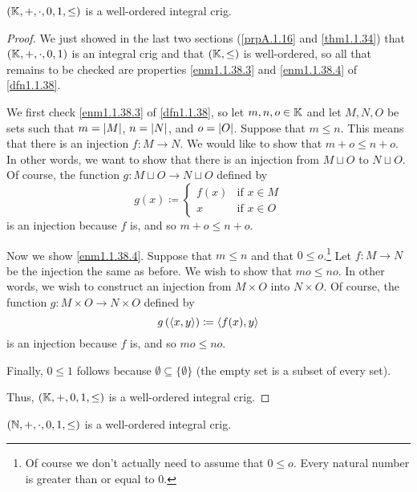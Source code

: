 \begin{prp}
$(\mathbb{K} ,+,\cdot ,0,1,\leq )$ is a well-ordered integral crig.
\begin{proof}
We just showed in the last two sections (\cref{prpA.1.16} and \cref{thm1.1.34}) that $(\mathbb{K} ,+,\cdot ,0,1)$ is an integral crig and that $(\mathbb{K} ,\leq )$ is well-ordered, so all that remains to be checked are properties \ref{enm1.1.38.3} and \ref{enm1.1.38.4} of \cref{dfn1.1.38}.

We first check \ref{enm1.1.38.3} of \cref{dfn1.1.38}, so let $m,n,o\in \mathbb{K}$ and let $M,N,O$ be sets such that $m=\lvert M\rvert$, $n=\lvert N\rvert$, and $o=\lvert O\rvert$.  Suppose that $m\leq n$.  This means that there is an injection $f:M\rightarrow N$.  We would like to show that $m+o\leq n+o$.  In other words, we want to show that there is an injection from $M\sqcup O$ to $N\sqcup O$.  Of course, the function $g:M\sqcup O\rightarrow N\sqcup O$ defined by
\begin{equation}
g(x)\coloneqq \begin{cases}f(x) & \text{if }x\in M \\ x & \text{if }x\in O\end{cases}
\end{equation}
is an injection because $f$ is, and so $m+o\leq n+o$.

Now we show \ref{enm1.1.38.4}.  Suppose that $m\leq n$ and that $0\leq o$.\footnote{Of course we don't actually need to assume that $0\leq o$.  Every natural number is greater than or equal to $0$.}  Let $f:M\rightarrow N$ be the injection the same as before.  We wish to show that $mo\leq no$.  In other words, we wish to construct an injection from $M\times O$ into $N\times O$.  Of course, the function $g:M\times O\rightarrow N\times O$ defined by
\begin{equation}
g\left( \langle x,y\rangle\right) \coloneqq \langle f(x),y\rangle
\end{equation}
is an injection because $f$ is, and so $mo\leq no$.

Finally, $0\leq 1$ follows because $\emptyset \subseteq \{ \emptyset \}$ (the empty set is a subset of every set).

Thus, $(\mathbb{K} ,+,0,1,\leq )$ is a well-ordered integral crig.
\end{proof}
\end{prp}
\begin{crl}
$(\mathbb{N} ,+,\cdot ,0,1,\leq )$ is a well-ordered integral crig.
\end{crl}

